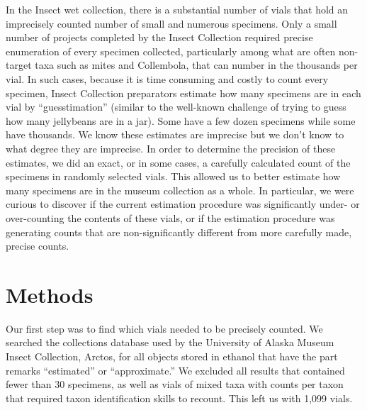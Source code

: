 \begin{multicols}{2}
In the  Insect wet collection, there is a substantial number of vials that hold an imprecisely counted number of small and numerous specimens. Only a small number of projects completed by the  Insect Collection required precise enumeration of every specimen collected, particularly among what are often non-target taxa such as mites and Collembola, that can number in the thousands per vial. In such cases, because it is time consuming and costly to count every specimen,  Insect Collection preparators estimate how many specimens are in each vial by “guesstimation” (similar to the well-known challenge of trying to guess how many jellybeans are in a jar). Some have a few dozen specimens while some have thousands. We know these estimates are imprecise but we don’t know to what degree they are imprecise. In order to determine the precision of these estimates, we did an exact, or in some cases, a carefully calculated count of the specimens in randomly selected vials. This allowed us to better estimate how many specimens are in the museum collection as a whole. In particular, we were curious to discover if the current estimation procedure was significantly under- or over-counting the contents of these vials, or if the estimation procedure was generating counts that are non-significantly different from more carefully made, precise counts. 

\section{Methods}
 
Our first step was to find which vials needed to be precisely counted. We searched the collections database used by the University of Alaska Museum Insect Collection, Arctos, for all objects stored in ethanol that have the part remarks ``estimated'' or ``approximate.'' We excluded all results that contained fewer than 30 specimens, as well as vials of mixed taxa with counts per taxon that required taxon identification skills to recount. This left us with 1,099 vials. 


\end{multicols}
